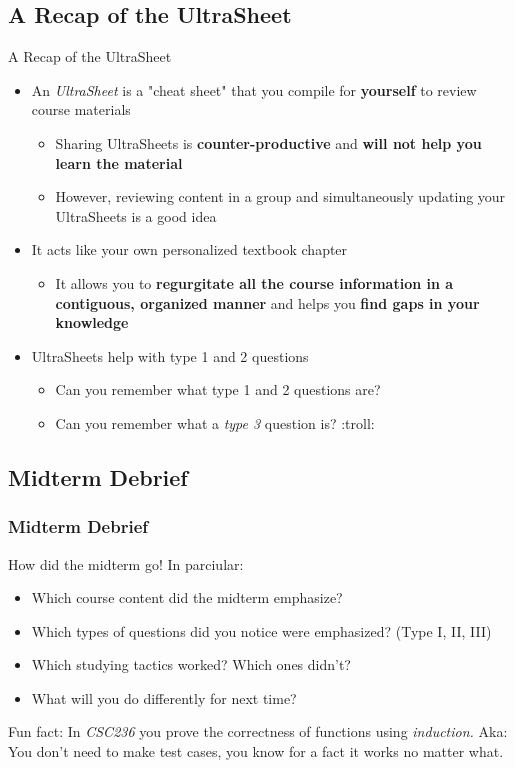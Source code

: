 \documentclass[hyperref={colorlinks,citecolor=blue,linkcolor=blue,urlcolor=blue}]{beamer}
\begin{document}
\subsection{A Recap of the UltraSheet\texttrademark{}}
\begin{frame}{A Recap of the UltraSheet\texttrademark{}}
  \begin{itemize}
    \item An \textit{UltraSheet\texttrademark{}} is a "cheat sheet" that you compile for \textbf{yourself} to review course materials 
    \begin{itemize}
      \item Sharing UltraSheets\texttrademark{} is \textbf{counter-productive} and \textbf{will not help you learn the material}
      \item However, reviewing content in a group and simultaneously updating your UltraSheets\texttrademark{} is a good idea
    \end{itemize}
    \item It acts like your own personalized textbook chapter
    \begin{itemize}
      \item It allows you to \textbf{regurgitate all the course information in a contiguous, organized manner} and helps you \textbf{find gaps in your knowledge}
    \end{itemize}
    \item UltraSheets\texttrademark{} help with type 1 and 2 questions 
    \begin{itemize}
      \item Can you remember what type 1 and 2 questions are?
      \item Can you remember what a \textit{type 3} question is? :troll:
    \end{itemize}
  \end{itemize}

\end{frame}

\subsection{Midterm Debrief}
\begin{frame}
  \frametitle{Midterm Debrief}
  How did the midterm go! In parciular:
  \begin{itemize}
    \item Which course content did the midterm emphasize?
    \item Which types of questions did you notice were emphasized? (Type I, II, III)
    \item Which studying tactics worked? Which ones didn't?
    \item What will you do differently for next time?
  \end{itemize}

  Fun fact: In \textit{CSC236} you prove the correctness of functions using \textit{induction.} Aka: You don't need to make test cases, you know for a fact it works no matter what. 
\end{frame}
\end{document}
